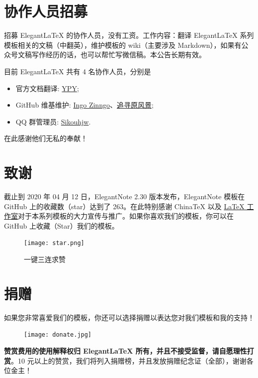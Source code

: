 \documentclass[cn,hazy,blue,10.5pt,normal]{elegantnote}
\begin{document}
\section{协作人员招募}

招募 Elegant\LaTeX{} 的协作人员，没有工资。工作内容：翻译 Elegant\LaTeX{} 系列模板相关的文稿（中翻英），维护模板的 wiki（主要涉及 Markdown），如果有公众号文稿写作经历的话，也可以帮忙写微信稿。本公告长期有效。

目前 ElegantLaTeX 共有 4 名协作人员，分别是
\begin{itemize}
  \item 官方文档翻译: \href{https://github.com/peggy2006xzyz}{YPY};
  \item GitHub 维基维护: \href{https://github.com/izinngo}{Ingo Zinngo}、\href{https://github.com/xiaohao890809}{追寻原风景};
  \item QQ 群管理员: \href{https://github.com/sikouhjw}{Sikouhjw}.
\end{itemize}

在此感谢他们无私的奉献！


\section{致谢}

截止到 2020 年 04 月 12 日，ElegantNote 2.30 版本发布，ElegantNote 模板在 GitHub 上的收藏数（star）达到了 263。在此特别感谢 China\TeX{} 以及 \href{http://www.latexstudio.net/}{\LaTeX{} 工作室}对于本系列模板的大力宣传与推广。如果你喜欢我们的模板，你可以在 GitHub 上收藏（Star）我们的模板。

\begin{figure}[htbp]
  \centering
  \texttt{[image: star.png]}
  \caption{一键三连求赞}
\end{figure}


\section{捐赠}

如果您非常喜爱我们的模板，你还可以选择捐赠以表达您对我们模板和我的支持！

\begin{figure}[htbp]
  \centering
  \texttt{[image: donate.jpg]}
\end{figure}

\textbf{赞赏费用的使用解释权归 Elegant\LaTeX{} 所有，并且不接受监督，请自愿理性打赏}。10 元以上的赞赏，我们将列入捐赠榜，并且发放捐赠纪念证（全部），谢谢各位金主！
\end{document}
